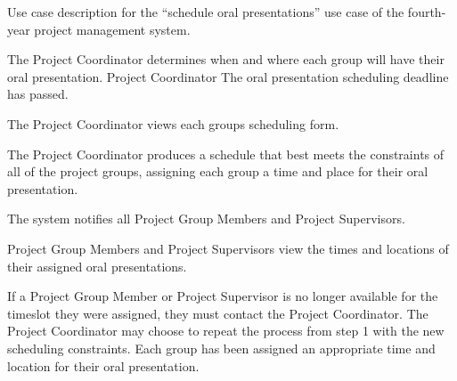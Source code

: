 \documentclass[document.tex]{subfiles}
\begin{document}
\begin{table}
  \centering
  \caption{Use case description for the ``schedule oral presentations'' use case of the fourth-year project management system.}
  \label{tbl:use-case-schedule-orals}

  \begin{usecase}
    The Project Coordinator determines when and where each group will have their oral presentation.
    Project Coordinator
    The oral presentation scheduling deadline has passed.
    \ucnormal
    \begin{ucenum}
      \item The Project Coordinator views each groups scheduling form.
      \item The Project Coordinator produces a schedule that best meets the constraints of all of the project groups, assigning each group a time and place for their oral presentation.
      \item The system notifies all Project Group Members and Project Supervisors.
      \item Project Group Members and Project Supervisors view the times and locations of their assigned oral presentations.
    \end{ucenum}
    If a Project Group Member or Project Supervisor is no longer available for the timeslot they were assigned, they must contact the Project Coordinator. The Project Coordinator may choose to repeat the process from step 1 with the new scheduling constraints.
    Each group has been assigned an appropriate time and location for their oral presentation.
  \end{usecase}
\end{table}
\end{document}
